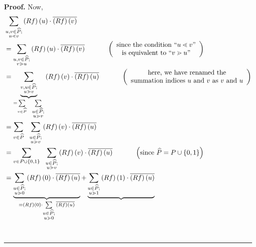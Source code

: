 \documentclass[numbers=enddot,12pt,final,onecolumn,notitlepage]{scrartcl}%
\theoremstyle{definition}
\newenvironment{verlong}{}{}
\newenvironment{proof}[1][Proof]{\noindent\textbf{#1.} }{\ \rule{0.5em}{0.5em}}
\let\sumnonlimits\sum
\renewcommand{\sum}{\sumnonlimits\limits}
\begin{document}
\begin{verlong}
\begin{proof}
Now,
\begin{align*}
&  \sum_{\substack{u,v\in\widehat{P};\\u\lessdot v}}\left(  Rf\right)  \left(
u\right)  \cdot\overline{\left(  Rf\right)  \left(  v\right)  }\\
&  =\sum_{\substack{u,v\in\widehat{P};\\v\gtrdot u}}\left(  Rf\right)  \left(
u\right)  \cdot\overline{\left(  Rf\right)  \left(  v\right)  }%
\ \ \ \ \ \ \ \ \ \ \left(
\begin{array}
[c]{c}%
\text{since the condition \textquotedblleft}u\lessdot
v\text{\textquotedblright}\\
\text{is equivalent to \textquotedblleft}v\gtrdot u\text{\textquotedblright}%
\end{array}
\right) \\
&  =\underbrace{\sum_{\substack{v,u\in\widehat{P};\\u\gtrdot v}}}_{=\sum
_{v\in\widehat{P}}\ \ \sum_{\substack{u\in\widehat{P};\\u\gtrdot v}}}\left(
Rf\right)  \left(  v\right)  \cdot\overline{\left(  Rf\right)  \left(
u\right)  }\ \ \ \ \ \ \ \ \ \ \left(
\begin{array}
[c]{c}%
\text{here, we have renamed the}\\
\text{summation indices }u\text{ and }v\text{ as }v\text{ and }u
\end{array}
\right) \\
&  =\sum_{v\in\widehat{P}}\ \ \sum_{\substack{u\in\widehat{P};\\u\gtrdot
v}}\left(  Rf\right)  \left(  v\right)  \cdot\overline{\left(  Rf\right)
\left(  u\right)  }\\
&  =\sum_{v\in P\cup\left\{  0,1\right\}  }\ \ \sum_{\substack{u\in
\widehat{P};\\u\gtrdot v}}\left(  Rf\right)  \left(  v\right)  \cdot
\overline{\left(  Rf\right)  \left(  u\right)  }\ \ \ \ \ \ \ \ \ \ \left(
\text{since }\widehat{P}=P\cup\left\{  0,1\right\}  \right) \\
&  =\underbrace{\sum_{\substack{u\in\widehat{P};\\u\gtrdot0}}\left(
Rf\right)  \left(  0\right)  \cdot\overline{\left(  Rf\right)  \left(
u\right)  }}_{=\left(  Rf\right)  \left(  0\right)  \cdot\sum_{\substack{u\in
\widehat{P};\\u\gtrdot0}}\overline{\left(  Rf\right)  \left(  u\right)  }%
}+\underbrace{\sum_{\substack{u\in\widehat{P};\\u\gtrdot1}}\left(  Rf\right)
\left(  1\right)  \cdot\overline{\left(  Rf\right)  \left(  u\right)  }%
}
\end{align*}
\end{proof}
\end{verlong}
\end{document}
